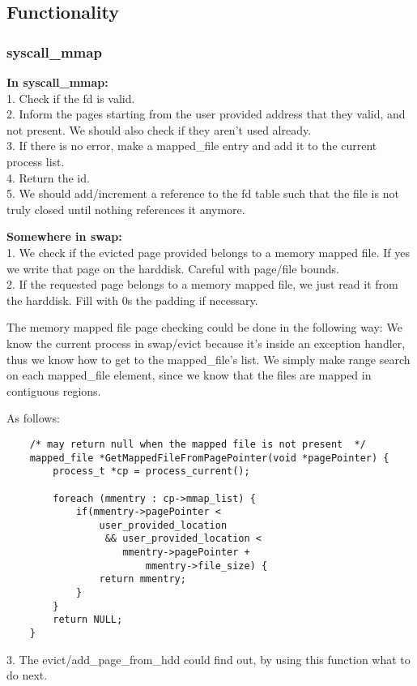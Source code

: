 \subsection{Functionality}

\subsubsection{ syscall\_mmap }
\textbf{In syscall\_mmap:}
	\\1. Check if the fd is valid.
	\\2. Inform the pages starting from the user provided address that they valid, and not present. We should also check if they aren't used already.
	\\3. If there is no error, make a mapped\_file entry and add it to the current process list.
	\\4. Return the id.
	\\5. We should add/increment a reference to the fd table such that the file is not truly closed until nothing references it anymore.



	\textbf{Somewhere in swap:}
	\\1. We check if the evicted page provided belongs to a memory mapped file. If yes we write that page on the harddisk. Careful with page/file bounds.
	\\2. If the requested page belongs to a memory mapped file, we just read it from the harddisk. Fill with 0s the padding if necessary.

The memory mapped file page checking could be done in the following way: We know the current process in swap/evict because it's inside an exception handler, thus we know how to get to the mapped\_file's list. We simply make range search on each mapped\_file element, since we know that the files are mapped in contiguous regions.

As follows:
\begin{lstlisting}	
	/* may return null when the mapped file is not present  */
	mapped_file *GetMappedFileFromPagePointer(void *pagePointer) {
		process_t *cp = process_current();
		
		foreach (mmentry : cp->mmap_list) {
			if(mmentry->pagePointer < 
				user_provided_location 
				 && user_provided_location < 
					mmentry->pagePointer + 
						mmentry->file_size) {
				return mmentry;
			}
		}
		return NULL;
	}
\end{lstlisting}
	3. The evict/add\_page\_from\_hdd could find out, by using this function what to do next.

